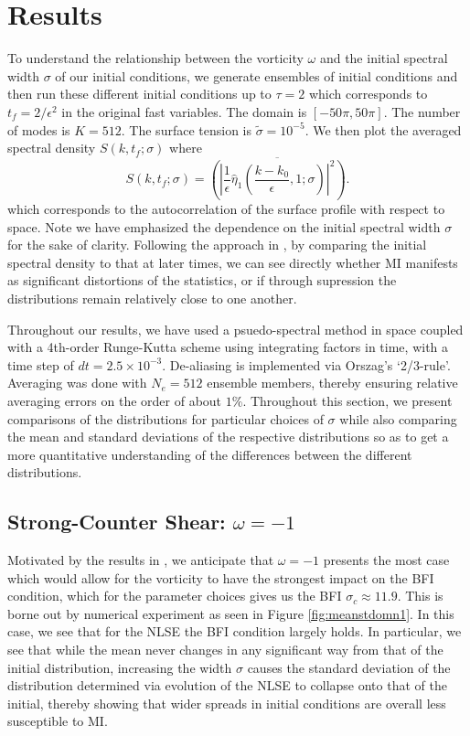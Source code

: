 \documentclass[a4paper,11pt]{article}
\begin{document}
\section*{Results}
To understand the relationship between the vorticity $\omega$ and the initial spectral width $\sigma$ of our initial conditions, we generate ensembles of initial conditions and then run these different initial conditions up to $\tau=2$ which corresponds to $t_{f} = 2/\epsilon^{2}$ in the original fast variables.  The domain is $[-50\pi,50\pi]$.  The number of modes is $K = 512$.  The surface tension is $\tilde{\sigma} = 10^{-5}$. We then plot the averaged spectral density $S(k,t_{f};\sigma)$ where 
\[
S\left(k,t_{f};\sigma\right) = \overline{\left( \left|\frac{1}{\epsilon}\hat{\eta}_{1}\left(\frac{k-k_{0}}{\epsilon},1;\sigma \right)\right|^{2}\right)}.
\]
which corresponds to the autocorrelation of the surface profile with respect to space.  Note we have emphasized the dependence on the initial spectral width $\sigma$ for the sake of clarity.  Following the approach in \cite{dysthe2,dysthe3}, by comparing the initial spectral density to that at later times, we can see directly whether MI manifests as significant distortions of the statistics, or if through supression the distributions remain relatively close to one another.  

Throughout our results, we have used a psuedo-spectral method in space coupled with a 4th-order Runge-Kutta scheme using integrating factors in time, with a time step of $dt = 2.5 \times 10^{-3}$.  De-aliasing is implemented via Orszag's `2/3-rule'.  Averaging was done with $N_{e}=512$ ensemble members, thereby ensuring relative averaging errors on the order of about $1\%$.  Throughout this section, we present comparisons of the distributions for particular choices of $\sigma$ while also comparing the mean and standard deviations of the respective distributions so as to get a more quantitative understanding of the differences between the different distributions.  

\subsection*{Strong-Counter Shear: $\omega = -1$}

Motivated by the results in \cite{curtis8}, we anticipate that $\omega=-1$ presents the most case which would allow for the vorticity to have the strongest impact on the BFI condition, which for the parameter choices gives us the BFI $\sigma_{c} \approx 11.9$.  This is borne out by numerical experiment as seen in Figure \ref{fig:meanstdomn1}.  In this case, we see that for the NLSE the BFI condition largely holds.  In particular, we see that while the mean never changes in any significant way from that of the initial distribution, increasing the width $\sigma$ causes the standard deviation of the distribution determined via evolution of the NLSE to collapse onto that of the initial, thereby showing that wider spreads in initial conditions are overall less susceptible to MI.   
\end{document}
